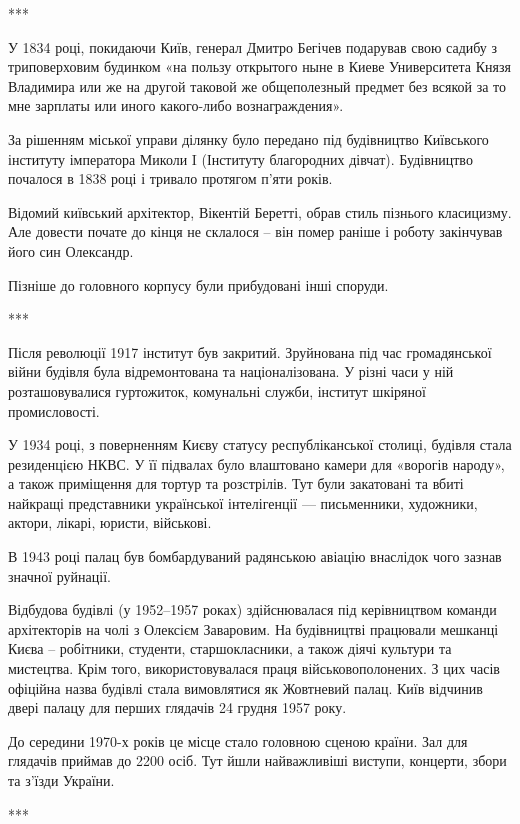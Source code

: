 ***

У 1834 році, покидаючи Київ, генерал Дмитро Бегічев подарував свою садибу з
триповерховим будинком «на пользу открытого ныне в Киеве Университета Князя
Владимира или же на другой таковой же общеполезный предмет без всякой за то мне
зарплаты или иного какого-либо вознаграждения». 

За рішенням міської управи ділянку було передано під будівництво Київського
інституту імператора Миколи I (Інституту благородних дівчат). Будівництво
почалося в 1838 році і тривало протягом п'яти років.


Відомий київський архітектор, Вікентій Беретті, обрав стиль пізнього
класицизму. Але довести почате до кінця не склалося – він помер раніше і роботу
закінчував його син Олександр. 


Пізніше до головного корпусу були прибудовані інші споруди.

***

Після революції 1917 інститут був закритий. Зруйнована під час громадянської
війни будівля була відремонтована та націоналізована. У різні часи у ній
розташовувалися гуртожиток, комунальні служби, інститут шкіряної промисловості. 

У 1934 році, з поверненням Києву статусу республіканської столиці, будівля
стала резиденцією НКВС. У її підвалах було влаштовано камери для «ворогів
народу», а також приміщення для тортур та розстрілів. Тут були закатовані та
вбиті найкращі представники української інтелігенції — письменники, художники,
актори, лікарі, юристи, військові. 

\begin{multicols}{3} %
\setlength{\parindent}{0pt}


\end{multicols} %

В 1943 році палац був бомбардуваний радянською авіацію внаслідок чого зазнав
значної руйнації.


Відбудова будівлі (у 1952–1957 роках) здійснювалася під керівництвом команди
архітекторів на чолі з  Олексієм Заваровим. На будівництві працювали мешканці
Києва – робітники, студенти, старшокласники, а також діячі культури та
мистецтва. Крім того, використовувалася праця військовополонених. З цих часів
офіційна назва будівлі стала вимовлятися як Жовтневий палац. Київ відчинив
двері палацу для перших глядачів 24 грудня 1957 року.

До середини 1970-х років це місце стало головною сценою країни. Зал для
глядачів приймав до 2200 осіб. Тут йшли найважливіші виступи, концерти, збори
та з'їзди України.

***
